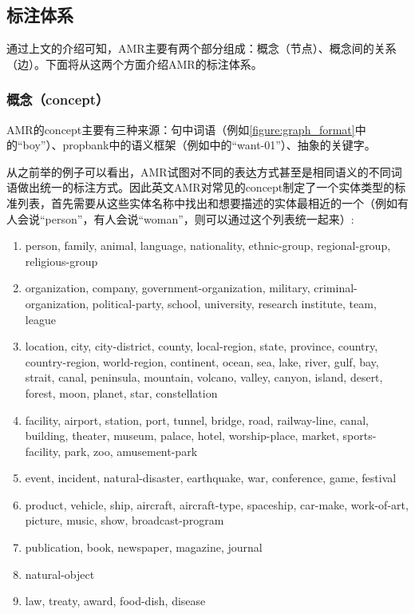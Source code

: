 \documentclass[master, winfont]{njuthesis}
\begin{document}
\subsection{标注体系}
通过上文的介绍可知，AMR主要有两个部分组成：概念（节点）、概念间的关系（边）。下面将从这两个方面介绍AMR的标注体系。

\subsubsection{概念（concept）}
AMR的concept主要有三种来源：句中词语（例如\ref{figure:graph_format}中的“boy”）、propbank中的语义框架（例如\label{figure:graph_format}中的“want-01”）、抽象的关键字。

从之前举的例子可以看出，AMR试图对不同的表达方式甚至是相同语义的不同词语做出统一的标注方式。因此英文AMR对常见的concept制定了一个实体类型的标准列表，首先需要从这些实体名称中找出和想要描述的实体最相近的一个（例如有人会说“person”，有人会说“woman”，则可以通过这个列表统一起来）:
\begin{enumerate}
  \item person, family, animal, language, nationality, ethnic-group, regional-group, religious-group
  \item organization, company, government-organization, military, criminal-organization, political-party, school, university, research institute, team, league
  \item location, city, city-district, county, local-region, state, province, country, country-region, world-region, continent, ocean, sea, lake, river, gulf, bay, strait, canal, peninsula, mountain, volcano, valley, canyon, island, desert, forest, moon, planet, star, constellation
  \item facility, airport, station, port, tunnel, bridge, road, railway-line, canal, building, theater, museum, palace, hotel, worship-place, market, sports-facility, park, zoo, amusement-park
  \item event, incident, natural-disaster, earthquake, war, conference, game, festival
  \item product, vehicle, ship, aircraft, aircraft-type, spaceship, car-make, work-of-art, picture, music, show, broadcast-program
  \item publication, book, newspaper, magazine, journal
  \item natural-object
  \item law, treaty, award, food-dish, disease
\end{enumerate}
\end{document}
